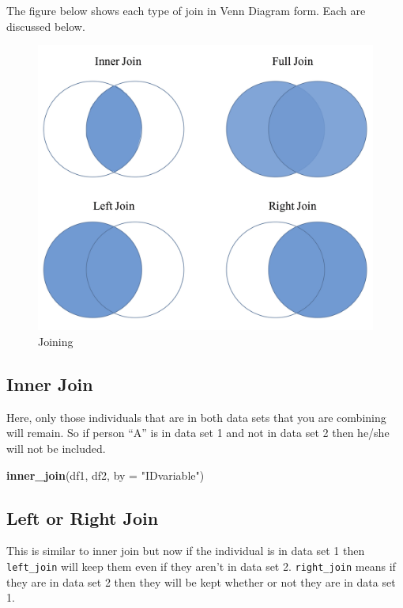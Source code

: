 \documentclass[]{tufte-book}
\newenvironment{Shaded}{}{}
\newcommand{\KeywordTok}[1]{\textcolor[rgb]{0.00,0.44,0.13}{\textbf{#1}}}
\newcommand{\DataTypeTok}[1]{\textcolor[rgb]{0.56,0.13,0.00}{#1}}
\newcommand{\StringTok}[1]{\textcolor[rgb]{0.25,0.44,0.63}{#1}}
\newcommand{\NormalTok}[1]{#1}
\theoremstyle{definition}
\theoremstyle{definition}
\theoremstyle{remark}
\begin{document}
The figure below shows each type of join in Venn Diagram form. Each are
discussed below.

\begin{figure}
\centering
\includegraphics{Joining.jpg}
\caption{Joining}
\end{figure}

\subsection*{Inner Join}\label{inner-join}

Here, only those individuals that are in both data sets that you are
combining will remain. So if person ``A'' is in data set 1 and not in
data set 2 then he/she will not be included.

\begin{Shaded}
\begin{Highlighting}[]
\KeywordTok{inner_join}\NormalTok{(df1, df2, }\DataTypeTok{by =} \StringTok{"IDvariable"}\NormalTok{)}
\end{Highlighting}
\end{Shaded}

\subsection*{Left or Right Join}\label{left-or-right-join}

This is similar to inner join but now if the individual is in data set 1
then \texttt{left\_join} will keep them even if they aren't in data set
2. \texttt{right\_join} means if they are in data set 2 then they will
be kept whether or not they are in data set 1.
\end{document}
